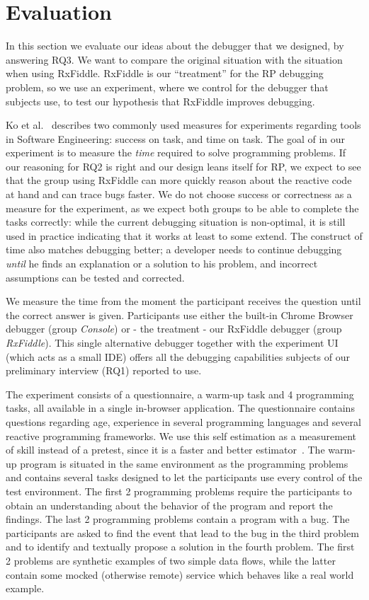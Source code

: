 \section{Evaluation}
\label{section-evaluation}

In this section we evaluate our ideas about the debugger that we designed, by answering RQ3. 
We want to compare the original situation with the situation when using RxFiddle. 
RxFiddle is our ``treatment'' for the RP debugging problem, so we use an experiment, where we control for the debugger that subjects use, to test our hypothesis that RxFiddle improves debugging.

Ko et al.~\cite{ko2015practical} describes two commonly used measures for experiments regarding tools in Software Engineering: success on task, and time on task.
The goal of in our experiment is to measure the \textit{time} required to solve programming problems.
If our reasoning for RQ2 is right and our design leans itself for RP, we expect to see that the group using RxFiddle can more quickly reason about the reactive code at hand and can trace bugs faster.
We do not choose success or correctness as a measure for the experiment, as we expect both groups to be able to complete the tasks correctly: while the current debugging situation is non-optimal, it is still used in practice indicating that it works at least to some extend.
The construct of time also matches debugging better; a developer needs to continue debugging \textit{until} he finds an explanation or a solution to his problem, and incorrect assumptions can be tested and corrected. 

We measure the time from the moment the participant receives the question until the correct answer is given. Participants use either the built-in Chrome Browser debugger (group \emph{Console}) or - the treatment - our RxFiddle debugger (group \emph{RxFiddle}). This single alternative debugger together with the experiment UI (which acts as a small IDE) offers all the debugging capabilities subjects of our preliminary interview (RQ1) reported to use.

The experiment consists of a questionnaire, a warm-up task and 4 programming tasks, all available in a single in-browser application. The questionnaire contains questions regarding age, experience in several programming languages and several reactive programming frameworks. We use this self estimation as a measurement of skill instead of a pretest, since it is a faster and better estimator~\cite{kleinschmager2011rate,feigenspan2012measuring,siegmund2014measuring}. The warm-up program is situated in the same environment as the programming problems and contains several tasks designed to let the participants use every control of the test environment. The first 2 programming problems require the participants to obtain an understanding about the behavior of the program and report the findings. The last 2 programming problems contain a program with a bug. The participants are asked to find the event that lead to the bug in the third problem and to identify and textually propose a solution in the fourth problem. The first 2 problems are synthetic examples of two simple data flows, while the latter contain some mocked (otherwise remote) service which behaves like a real world example.

